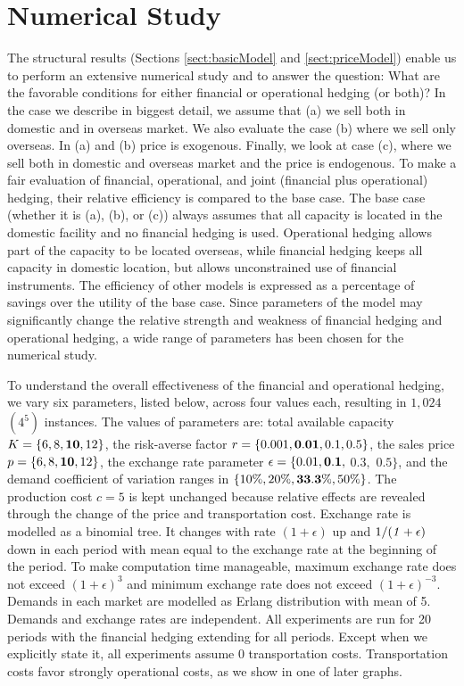 \documentclass[mnsc,nonblindrev,copyedit]{informs2_wz} %
\begin{document}
\section{Numerical Study \label{sect:numer}}

The structural results (Sections \ref{sect:basicModel} and \ref{sect:priceModel}) enable us to perform an extensive numerical study and to answer the question: What are the favorable conditions for either financial or operational hedging (or both)?  In the case we describe in biggest detail, we assume that (a) we sell both in domestic and in overseas market.  We also evaluate the case (b) where we sell only overseas.  In (a) and (b) price is exogenous.  Finally, we look at case (c), where we sell both in domestic and overseas market and the price is endogenous.  To make a fair evaluation of financial, operational, and joint (financial plus operational) hedging, their relative efficiency is compared to the base case.  The base case (whether it is (a), (b), or (c)) always assumes that all capacity is located in the domestic facility and no financial hedging is used.  Operational hedging allows part of the capacity to be located overseas, while financial hedging keeps all capacity in domestic location, but allows unconstrained use of financial instruments.  The efficiency of other models is expressed as a percentage of savings over the utility of the base case.  Since parameters of the model may significantly change the relative strength and weakness of financial hedging and operational hedging, a wide range of parameters has been chosen for the numerical study.

To understand the overall effectiveness of the financial and operational hedging, we vary six parameters, listed below, across four values each, resulting in $1,024$ $(4^5)$ instances.  The values of parameters are: total available capacity $K= \{6, 8, \bold{10}, 12\}$, the risk-averse factor $r = \{0.001, \bold{0.01}, 0.1, 0.5\}$, the sales price $p = \{6, 8, \bold{10}, 12\}$, the exchange rate parameter $\epsilon=\{0.01, \bold{0.1},$ $0.3,$ $0.5 \}$, and the demand coefficient of variation ranges in $\{10\%, 20\%, \bold{33.3\%}, 50\%\}$.  The production cost $c=5$ is kept unchanged because relative effects are revealed through the change of the price and transportation cost.  Exchange rate is modelled as a binomial tree.  It changes with rate {\it $(1+\epsilon)$} up and $1/{\it (1+\epsilon)}$ down in each period with mean equal to the exchange rate at the beginning of the period.  To make computation time manageable, maximum exchange rate does not exceed $(1+\epsilon)^3$ and minimum exchange rate does not exceed $(1+\epsilon)^{-3}$.  Demands in each market are modelled as Erlang distribution with mean of 5.  Demands and exchange rates are independent.  All experiments are run for 20 periods with the financial hedging extending for all periods.  Except when we explicitly state it, all experiments assume 0 transportation costs.  Transportation costs favor strongly operational costs, as we show in one of later graphs.
\end{document}
